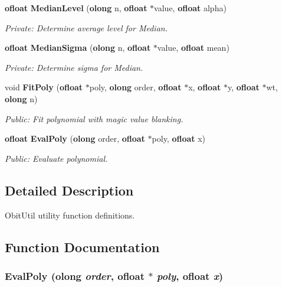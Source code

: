 \begin{CompactItemize}
{\bf ofloat} {\bf Median\-Level} ({\bf olong} n, {\bf ofloat} $\ast$value, {\bf ofloat} alpha)
\begin{CompactList}\small\item\em Private: Determine average level for Median. \item\end{CompactList}\item 
{\bf ofloat} {\bf Median\-Sigma} ({\bf olong} n, {\bf ofloat} $\ast$value, {\bf ofloat} mean)
\begin{CompactList}\small\item\em Private: Determine sigma for Median. \item\end{CompactList}\item 
void {\bf Fit\-Poly} ({\bf ofloat} $\ast$poly, {\bf olong} order, {\bf ofloat} $\ast$x, {\bf ofloat} $\ast$y, {\bf ofloat} $\ast$wt, {\bf olong} n)
\begin{CompactList}\small\item\em Public: Fit polynomial with magic value blanking. \item\end{CompactList}\item 
{\bf ofloat} {\bf Eval\-Poly} ({\bf olong} order, {\bf ofloat} $\ast$poly, {\bf ofloat} x)
\begin{CompactList}\small\item\em Public: Evaluate polynomial. \item\end{CompactList}\end{CompactItemize}


\subsection{Detailed Description}
Obit\-Util utility function definitions. 



\subsection{Function Documentation}
\subsubsection{ Eval\-Poly ({\bf olong} {\em order}, {\bf ofloat} $\ast$ {\em poly}, {\bf ofloat} {\em x})}\label{ObitUtil_8c_a8}


